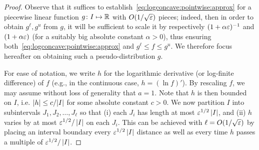 \begin{proof}
  Observe that it suffices to establish~\cref{eq:logconcave:pointwise:approx} for a piecewise linear function $g\colon I\mapsto \mathbb{R}$ with $\bigO{1/\sqrt{\eps}}$ pieces; indeed, then in order to obtain $g^\ell,g^u$ from $g$, it will be sufficient to scale it by respectively $(1+\alpha\varepsilon)^{-1}$ and  $(1+\alpha\varepsilon)$ (for a suitably big absolute constant $\alpha>0$), thus ensuring both~\cref{eq:logconcave:pointwise:approx} and $g^\ell\leq f\leq g^u$. We therefore focus hereafter on obtaining such a pseudo-distribution $g$.

  For ease of notation, we write $h$ for the logarithmic derivative (or log-finite difference) of $f$ (e.g., in the continuous case, $h=(\ln f)'$). By rescaling $f$, we may assume without loss of generality that $a=1$. Note that $h$ is then bounded on $I$, i.e. $\left\lvert h \right\rvert\leq {c}/{\left\lvert I \right\rvert}$ for some absolute constant $c>0$.  We now partition $I$ into subintervals $J_1,J_2,\ldots,J_\ell$ so that (i) each $J_i$ has length at most $\varepsilon^{1/2}\left\lvert I \right\rvert$, and (ii) $h$ varies by at most $\varepsilon^{1/2}/\left\lvert I \right\rvert$ on each $J_i$. This can be achieved with $\ell=\bigO{1/\sqrt{\eps}}$ by placing an interval boundary every $\varepsilon^{1/2}\left\lvert I \right\rvert$ distance as well as every time $h$ passes a multiple of $\varepsilon^{1/2}/\left\lvert I \right\rvert$.


\end{proof}
